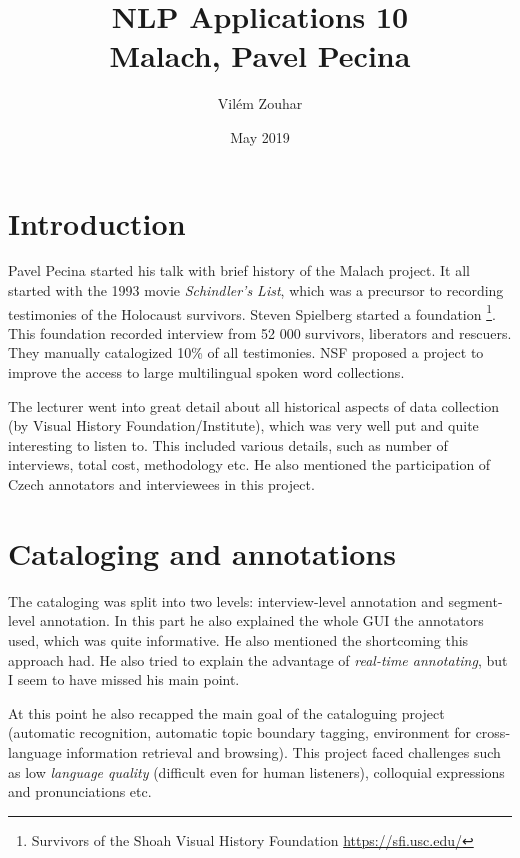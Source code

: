 \documentclass[a4paper]{article}
\begin{document}
\title{NLP Applications 10\\Malach, Pavel Pecina}
\author{Vilém Zouhar}
\date{May 2019}
\maketitle 

\section*{Introduction}

Pavel Pecina started his talk with brief history of the Malach project. It all started with the 1993 movie \textit{Schindler's List}, which was a precursor to recording testimonies of the Holocaust survivors. Steven Spielberg started a foundation \footnote{Survivors of the Shoah Visual History Foundation \href{https://sfi.usc.edu/}{https://sfi.usc.edu/}}. This foundation recorded interview from 52 000 survivors, liberators and rescuers. They manually catalogized 10\% of all testimonies. NSF proposed a project to improve the access to large multilingual spoken word collections.

The lecturer went into great detail about all historical aspects of data collection (by Visual History Foundation/Institute), which was very well put and quite interesting to listen to. This included various details, such as number of interviews, total cost, methodology etc. He also mentioned the participation of Czech annotators and interviewees in this project.

\section*{Cataloging and annotations}

The cataloging was split into two levels: interview-level annotation and segment-level annotation. In this part he also explained the whole GUI the annotators used, which was quite informative. He also mentioned the shortcoming this approach had. He also tried to explain the advantage of \textit{real-time annotating}, but I seem to have missed his main point.

At this point he also recapped the main goal of the cataloguing project (automatic recognition, automatic topic boundary tagging, environment for cross-language information retrieval and browsing). This project faced challenges such as low \textit{language quality} (difficult even for human listeners), colloquial expressions and pronunciations etc.
\end{document}
